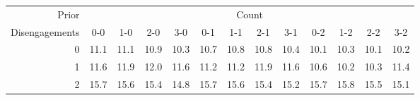 \begin{tabular}{r|cccc|cccc|cccc}
Prior & \multicolumn{12}{c}{Count}\\
Disengagements & 0-0 & 1-0 & 2-0 & 3-0 & 0-1 & 1-1 & 2-1 & 3-1 & 0-2 & 1-2 & 2-2 & 3-2 \\
  \hline
0 & 11.1 & 11.1 & 10.9 & 10.3 & 10.7 & 10.8 & 10.8 & 10.4 & 10.1 & 10.3 & 10.1 & 10.2 \\ 
  1 & 11.6 & 11.9 & 12.0 & 11.6 & 11.2 & 11.2 & 11.9 & 11.6 & 10.6 & 10.2 & 10.3 & 11.4 \\ 
  2 & 15.7 & 15.6 & 15.4 & 14.8 & 15.7 & 15.6 & 15.4 & 15.2 & 15.7 & 15.8 & 15.5 & 15.1 \\ 
\end{tabular}
